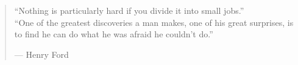 
\begin{quote}
    “Nothing is particularly hard if you divide it into small jobs.” \\
    “One of the greatest discoveries a man makes, one of his great surprises, is to find he can do what he was afraid he couldn’t do.” \\  
    \begin{footnotesize}
        --- Henry Ford
    \end{footnotesize}
\end{quote}
